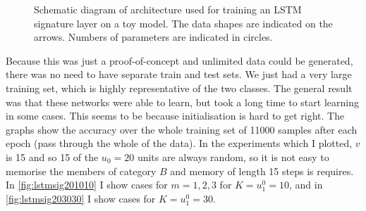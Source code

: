 \begin{figure}
\centering
\caption[LSTM signature schematic]{\label{fig:toyLSTM}Schematic diagram of architecture used for training an LSTM signature layer on a toy model. 
The data shapes are indicated on the arrows. 
Numbers of parameters are indicated in circles.}
\end{figure}

Because this was just a proof-of-concept and unlimited data could be generated, there was no need to have separate train and test sets. We just had a very large training set, which is highly representative of the two classes. The general result was that these networks were able to learn, but took a long time to start learning in some cases. This 
seems to be because initialisation is hard to get right. 
The graphs show the accuracy over the whole training set of 11000 samples after each epoch (pass through the whole of the data).
In the experiments which I plotted, $v$ is 15 and so 15 of the $u_0=20$ units are always random, so it is not easy to memorise the members of category $B$ and memory of length 15 steps is requires.
In \autoref{fig:lstmsig201010} I show cases for $m=1,2,3$ for $K=u_1^0=10$, and in \autoref{fig:lstmsig203030} I show cases for $K=u_1^0=30$.

